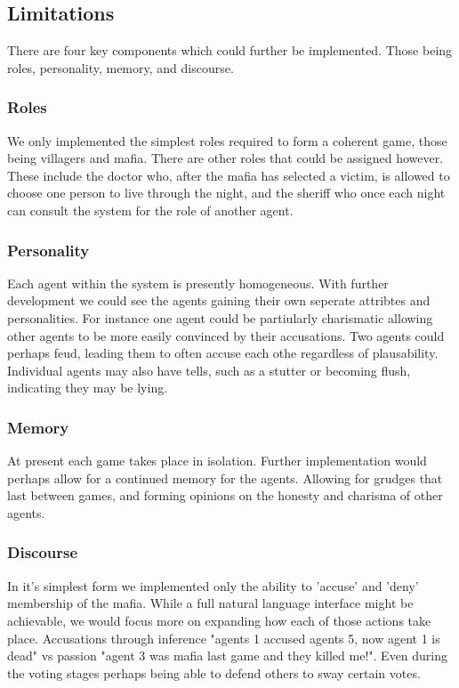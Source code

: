 \documentclass[12pt]{article} %
\begin{document}
\subsection{Limitations}

There are four key components which could further be implemented. Those being roles, personality, memory, and discourse.

\subsubsection{Roles}
We only implemented the simplest roles required to form a coherent game, those being villagers and mafia. There are other roles that could be assigned however. These include the doctor who, after the mafia has selected a victim, is allowed to choose one person to live through the night, and the sheriff who once each night can consult the system for the role of another agent.

\subsubsection{Personality}
Each agent within the system is presently homogeneous. With further development we could see the agents gaining their own seperate attribtes and personalities. For instance one agent could be partiularly charismatic allowing other agents to be more easily convinced by their accusations. Two agents could perhaps feud, leading them to often accuse each othe regardless of plausability. Individual agents may also have tells, such as a stutter or becoming flush, indicating they may be lying.


\subsubsection{Memory}
At present each game takes place in isolation. Further implementation would perhaps allow for a continued memory for the agents. Allowing for grudges that last between games, and forming opinions on the honesty and charisma of other agents.

\subsubsection{Discourse}
In it's simplest form we implemented only the ability to 'accuse' and 'deny' membership of the mafia. While a full natural language interface might be achievable, we would focus more on expanding how each of those actions take place. Accusations through inference "agents 1 accused agents 5, now agent 1 is dead" vs passion "agent 3 was mafia last game and they killed me!". Even during the voting stages perhaps being able to defend others to sway certain votes.
\end{document}
